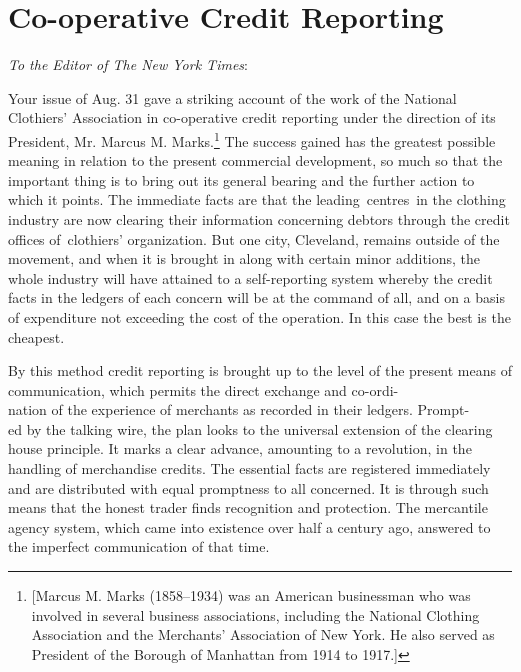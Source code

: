\documentclass[twoside,symmetric,nobib,justified]{tufte-book}
\let\oldchapter\chapter
\def\chapter{%
  \setcounter{footnote}{0}%
  \oldchapter
}
\begin{document}
\chapter[Co-operative Credit Reporting]{Co-operative Credit Reporting}
\label{ch:Co-operative Credit Reporting}

\vspace{.2in}

\begin{LARGE}


\end{LARGE}

\vspace{0.4in}


\noindent\emph{To the Editor of The New York Times}:

\vspace{0.1in}

Your issue of Aug. 31 gave a striking account of the work of the
National Clothiers' Association in co-operative credit reporting under
the direction of its President, Mr. Marcus M. Marks.\footnote{{[}Marcus
  M. Marks (1858--1934) was an American businessman who was involved in
  several business associations, including the National Clothing
  Association and the Merchants' Association of New York. He also served
  as President of the Borough of Manhattan from 1914 to 1917.{]}} The
success gained has the greatest possible meaning in relation to the
present commercial development, so much so that the important thing is
to bring out its general bearing and the further action to which it
points. The immediate facts are that the leading~centres~in the clothing
industry are now clearing their information concerning debtors through
the credit offices of~clothiers' organization. But one city, Cleveland,
remains outside of the movement, and when it is brought in along with
certain minor additions, the whole industry will have attained to a
self-reporting system whereby the credit facts in the ledgers of each
concern will be at the command of all, and on a basis of expenditure not
exceeding the cost of the operation. In this case the best is the
cheapest.~

By this method credit reporting is brought up to the level of the
present means of communication, which permits the direct exchange and
co-ordi-\\\noindent nation of the experience of merchants as recorded in
their ledgers. Prompt-\\\noindent ed by the talking wire, the plan looks to the
universal extension of the clearing house principle. It marks a clear
advance, amounting to a revolution, in the handling of merchandise
credits. The essential facts are registered immediately and are
distributed with equal promptness to all concerned. It is through such
means that the honest trader finds recognition and protection. The
mercantile agency system, which came into existence over half a century
ago, answered to the imperfect communication of that time.~
\end{document}
